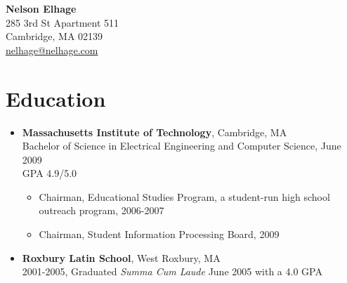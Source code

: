 \documentclass[letterpaper,10pt]{article}
\begin{document}
\begin{center}
  {\LARGE \bf Nelson Elhage}\\
  {\large
    285 3rd St Apartment 511 \\
    Cambridge, MA 02139 \\
    \mbox{\url{nelhage@nelhage.com}}}
\end{center}

\section*{Education}
\vspace*{-0.2cm}
\begin{itemize}
  \item \textbf{Massachusetts Institute of Technology}, Cambridge, MA
    \\ Bachelor of Science in Electrical
    Engineering and Computer Science, June 2009 \\
    GPA 4.9/5.0
    \vspace*{-0.2cm}
    \begin{itemize}
      \item Chairman, Educational Studies Program, a student-run
        high school outreach program, 2006-2007
      \item Chairman, Student Information Processing Board, 2009
    \end{itemize}
  \item \textbf{Roxbury Latin School}, West Roxbury, MA \\ 2001-2005,
    Graduated {\em Summa Cum Laude} June 2005 with a 4.0 GPA
\end{itemize}

\vspace*{-0.7cm}
\end{document}
